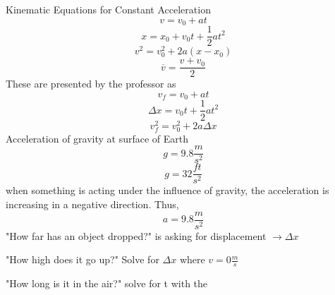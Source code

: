 \documentclass[12pt,a4paper,english]{article}
\begin{document}
\begin{flushleft}
Kinematic Equations for Constant Acceleration
\[ v=v_{0}+at
\]
\[ x=x_{0}+v_{0}t + \frac{1}{2}at^2
\]
\[ v^2=v_{0}^2+2a(x-x_{0})
\]
\[\overline{v}=\frac{v+v_{0}}{2}
\]
These are presented by the professor as
\[ v_{f}=v_{0}+at
\]
\[ \Delta x=v_{0}t+\frac{1}{2}at^2
\]
\[v_{f}^2=v_{0}^2+2a\Delta x
\]
Acceleration of gravity at surface of Earth
\[ g=9.8\frac{m}{s^2}
\]
\[ g=32\frac{ft}{s^2}
\]
when something is acting under the influence of gravity, the acceleration is increasing in a negative direction. Thus,
\[ a = 9.8\frac{m}{s^2}

\]
"How far has an object dropped?" is asking for displacement $ \to \Delta x$ 

"How high does it go up?" Solve for $\Delta x$ where $ v=0\frac{m}{s}$ 

"How long is it in the air?" solve for t with the 
\end{flushleft}
\end{document}
